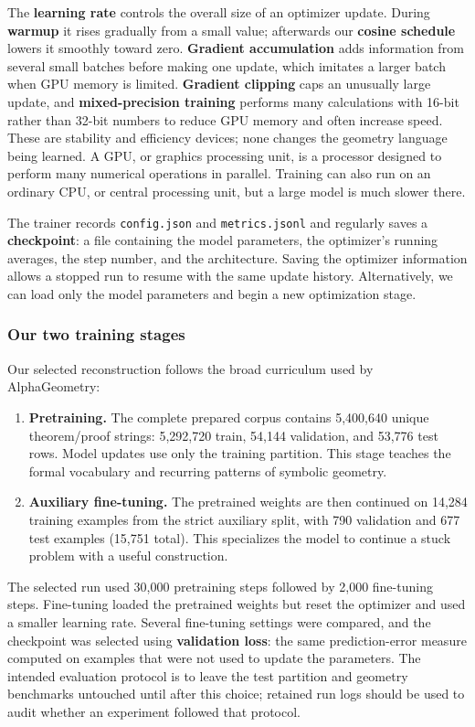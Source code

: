 \documentclass[reqno]{amsart}
\newcommand{\keyterm}[1]{\textbf{\color{agblue}#1}}
\DeclareMathOperator{\1}{\textbf{1}}
\begin{document}
The \keyterm{learning rate} controls the overall size of an optimizer update.
During \keyterm{warmup} it rises gradually from a small value; afterwards our
\keyterm{cosine schedule} lowers it smoothly toward zero.  \keyterm{Gradient
accumulation} adds information from several small batches before making one
update, which imitates a larger batch when GPU memory is limited.
\keyterm{Gradient clipping} caps an unusually large update, and
\keyterm{mixed-precision training} performs many calculations with 16-bit
rather than 32-bit numbers to reduce GPU memory and often increase speed.
These are stability and efficiency devices; none changes the geometry
language being learned.  A GPU, or graphics processing unit, is a processor
designed to perform many numerical operations in parallel.  Training can also
run on an ordinary CPU, or central processing unit, but a large model is much
slower there.

The trainer records \verb|config.json| and \verb|metrics.jsonl| and regularly
saves a \keyterm{checkpoint}: a file containing the model parameters, the
optimizer's running averages, the step number, and the architecture.  Saving
the optimizer information allows a stopped run to resume with the same update
history.  Alternatively, we can load only the model parameters and begin a new
optimization stage.

\subsubsection{Our two training stages}

Our selected reconstruction follows the broad curriculum used by
AlphaGeometry:
\begin{enumerate}
    \item \textbf{Pretraining.} The complete prepared corpus contains
          5,400,640 unique theorem/proof strings: 5,292,720 train, 54,144
          validation, and 53,776 test rows. Model updates use only the training
          partition. This stage teaches the formal vocabulary and recurring
          patterns of symbolic geometry.
    \item \textbf{Auxiliary fine-tuning.} The pretrained weights are then
          continued on 14,284 training examples from the strict auxiliary
          split, with 790 validation and 677 test examples (15,751 total).
          This specializes the model to continue a stuck problem with a useful
          construction.
\end{enumerate}
The selected run used 30,000 pretraining steps followed by 2,000 fine-tuning
steps.  Fine-tuning loaded the pretrained weights but reset the optimizer and
used a smaller learning rate.  Several fine-tuning settings were compared,
and the checkpoint was selected using \keyterm{validation loss}: the same
prediction-error measure computed on examples that were not used to update the
parameters. The intended evaluation protocol is to leave the test partition
and geometry benchmarks untouched until after this choice; retained run logs
should be used to audit whether an experiment followed that protocol.
\end{document}

